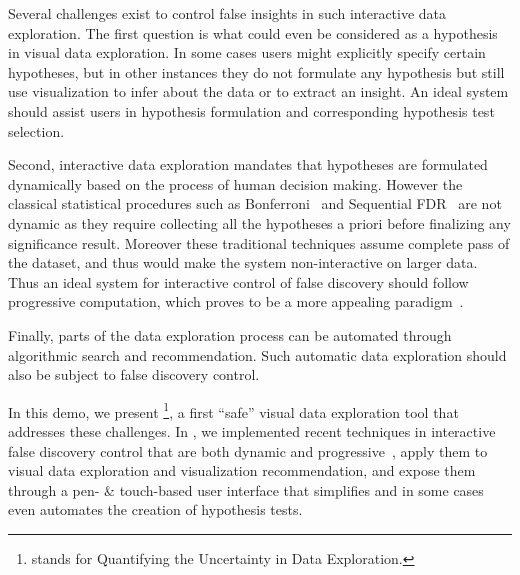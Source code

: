 Several challenges exist to control false insights in such interactive data exploration.  
The first question is what could even be considered as a hypothesis in visual data exploration.
In some cases users might explicitly specify certain hypotheses, but in other instances they do not formulate any hypothesis but still use visualization to infer about the data or to extract an insight.
An ideal system should assist users in hypothesis formulation and corresponding hypothesis test selection.

Second, interactive data exploration mandates that hypotheses are formulated dynamically based on the process of human decision making.  
However the classical statistical procedures such as Bonferroni~\cite{bonferroni1936teoria} and Sequential FDR~\cite{g2016sequential} are not dynamic as they require collecting all the hypotheses a priori before finalizing any significance result.  
Moreover these traditional techniques assume complete pass of the dataset, and thus would make the system non-interactive on larger data.  
Thus an ideal system for interactive control of false discovery should follow progressive computation, which proves to be a more appealing paradigm~\cite{vizdom, onlineagg, zgraggen2016progressive}.  

Finally, parts of the data exploration process can be automated through algorithmic search and recommendation. Such automatic data exploration should also be subject to false discovery control.  

In this demo, we present \system{}\footnote{\system{} stands for Quantifying the Uncertainty in Data Exploration.}, a first ``safe'' visual data exploration tool that addresses these challenges. 
In \system{}, we implemented recent techniques in interactive false discovery control that are both dynamic and progressive~\cite{zhao2016controlling}, apply them to visual data exploration and visualization recommendation, and expose them through a pen- \& touch-based user interface that simplifies and in some cases even automates the creation of hypothesis tests.



